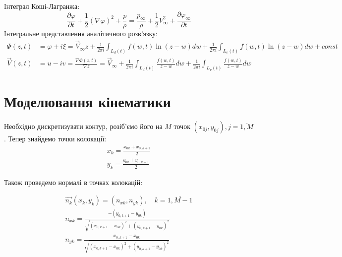 \documentclass[a4paper,12pt]{article}
\begin{document}
	Інтеграл Коші-Лагранжа:
	\[
	\frac{\partial \varphi}{\partial t} + \frac{1}{2}\left( \nabla \varphi \right)^2 + \frac{p}{\rho} = \frac{p_{\infty}}{\rho} + \frac{1}{2} V_{\infty}^2 + \frac{\partial \varphi_{\infty}}{\partial t}
	\]
	Інтегральне представлення аналітичного розв'язку:
	\begin{align}
		\Phi(z,t) &= \varphi + i\xi = \vec{V}_\infty z + \frac{1}{2 \pi i} \int_{L_d(t)} f(w,t) \ln{(z - w)}dw + \frac{1}{2 \pi i} \int_{L_v(t)} f(w,t) \ln{(z - w)}dw + const \nonumber \\
		\vec{V}(z,t) &= u- iv = \frac{\nabla \Phi(z,t)}{\nabla z} = \vec{V}_\infty + \frac{1}{2 \pi i} \int_{L_d(t)} \frac{f(w,t)}{z - w} dw + \frac{1}{2 \pi i} \int_{L_v(t)} \frac{f(w,t)}{z - w} dw \nonumber
	\end{align}
\section{Моделювання кінематики}

	Необхідно дискретизувати контур, розіб'ємо його на $M$ точок $(x_{0j}, y_{0j}), j = \overline{1,M}$. Тепер знайдемо точки колокації:
	\begin{eqnarray}
		x_k = \frac{x_{0k} + x_{0, k+1}}{2} \nonumber \\
		y_k = \frac{y_{0k} + y_{0, k+1}}{2} \nonumber
	\end{eqnarray}
	
	Також проведемо нормалі в точках колокацій:
	
	\begin{align} 
		\overrightarrow{n_k} (x_k, y_k) = (n_{xk}, n_{yk}),\quad  k = \overline{1, M-1} \nonumber \\
		n_{xk} = \frac{-(y_{0,k+1} - y_{0k})}{\sqrt{(x_{0, k+1} -  x_{0k})^2 + (y_{0,k+1} - y_{0k})^2}} \nonumber \\
		n_{yk} = \frac{x_{0, k+1} -  x_{0k}}{\sqrt{(x_{0, k+1} -  x_{0k})^2 + (y_{0,k+1} - y_{0k})^2}} \nonumber
	\end{align}
	
\end{document}
